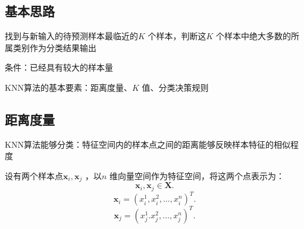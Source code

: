 {}
\subsection*{基本思路}%
\label{sub:基本思路}
找到与新输入的待预测样本最临近的$K$ 个样本，判断这$K$ 个样本中绝大多数的所属类别作为分类结果输出

条件：已经具有较大的样本量
\begin{center}
\end{center}
\begin{notation}
    KNN算法的基本要素：距离度量、$K$ 值、分类决策规则
\end{notation}
\subsection*{距离度量}%
\label{sub:距离度量}
\begin{notation}
    KNN算法能够分类：特征空间内的样本点之间的距离能够反映样本特征的相似程度
\end{notation}
设有两个样本点$\bm{x}_{i},\bm{x}_{j}$ ，以$n$ 维向量空间作为特征空间，将这两个点表示为：
\[
    \bm{x}_i,\bm{x}_{j}\in \bm{X}
.\]
\[
    \bm{x}_i=\left( x_{i}^{1},x_{i}^2,\ldots,x_{i}^{n} \right)^{T}
.\] 
\[
    \bm{x}_j=\left( x_{j}^1.x_{j}^2,\ldots,x_{j}^{n} \right) ^{T}
.\] 

